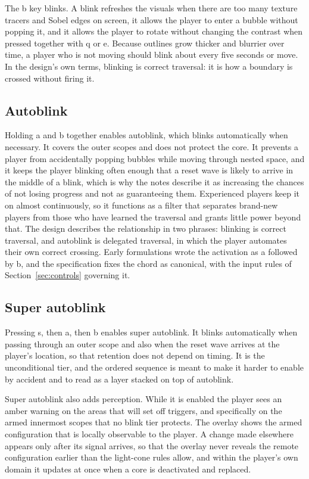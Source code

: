 \documentclass[11pt]{article}
\begin{document}
The b key blinks. A blink refreshes the visuals when there are too many texture tracers and Sobel edges on screen, it allows the player to enter a bubble without popping it, and it allows the player to rotate without changing the contrast when pressed together with q or e. Because outlines grow thicker and blurrier over time, a player who is not moving should blink about every five seconds or move. In the design's own terms, blinking is correct traversal: it is how a boundary is crossed without firing it.

\subsection{Autoblink}

Holding a and b together enables autoblink, which blinks automatically when necessary. It covers the outer scopes and does not protect the core. It prevents a player from accidentally popping bubbles while moving through nested space, and it keeps the player blinking often enough that a reset wave is likely to arrive in the middle of a blink, which is why the notes describe it as increasing the chances of not losing progress and not as guaranteeing them. Experienced players keep it on almost continuously, so it functions as a filter that separates brand-new players from those who have learned the traversal and grants little power beyond that. The design describes the relationship in two phrases: blinking is correct traversal, and autoblink is delegated traversal, in which the player automates their own correct crossing. Early formulations wrote the activation as a followed by b, and the specification fixes the chord as canonical, with the input rules of Section~\ref{sec:controls} governing it.

\subsection{Super autoblink}

Pressing s, then a, then b enables super autoblink. It blinks automatically when passing through an outer scope and also when the reset wave arrives at the player's location, so that retention does not depend on timing. It is the unconditional tier, and the ordered sequence is meant to make it harder to enable by accident and to read as a layer stacked on top of autoblink.

Super autoblink also adds perception. While it is enabled the player sees an amber warning on the areas that will set off triggers, and specifically on the armed innermost scopes that no blink tier protects. The overlay shows the armed configuration that is locally observable to the player. A change made elsewhere appears only after its signal arrives, so that the overlay never reveals the remote configuration earlier than the light-cone rules allow, and within the player's own domain it updates at once when a core is deactivated and replaced.
\end{document}
